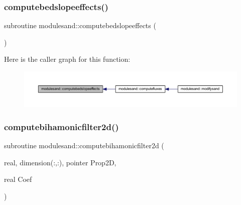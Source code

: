 \subsubsection{\texorpdfstring{computebedslopeeffects()}{computebedslopeeffects()}}
{\footnotesize\ttfamily subroutine modulesand\+::computebedslopeeffects (\begin{DoxyParamCaption}{ }\end{DoxyParamCaption})\hspace{0.3cm}{\ttfamily [private]}}

Here is the caller graph for this function\+:\nopagebreak
\begin{figure}[H]
\begin{center}
\leavevmode
\includegraphics[width=350pt]{namespacemodulesand_a9176419680bd2427b3dbc5e9807c9ca3_icgraph}
\end{center}
\end{figure}
\mbox{\label{namespacemodulesand_a3ea5b505a0fc6d89be163ff10c0f515e}} 
\subsubsection{\texorpdfstring{computebihamonicfilter2d()}{computebihamonicfilter2d()}}
{\footnotesize\ttfamily subroutine modulesand\+::computebihamonicfilter2d (\begin{DoxyParamCaption}\item[{real, dimension(\+:,\+:), pointer}]{Prop2D,  }\item[{real}]{Coef }\end{DoxyParamCaption})\hspace{0.3cm}{\ttfamily [private]}}

